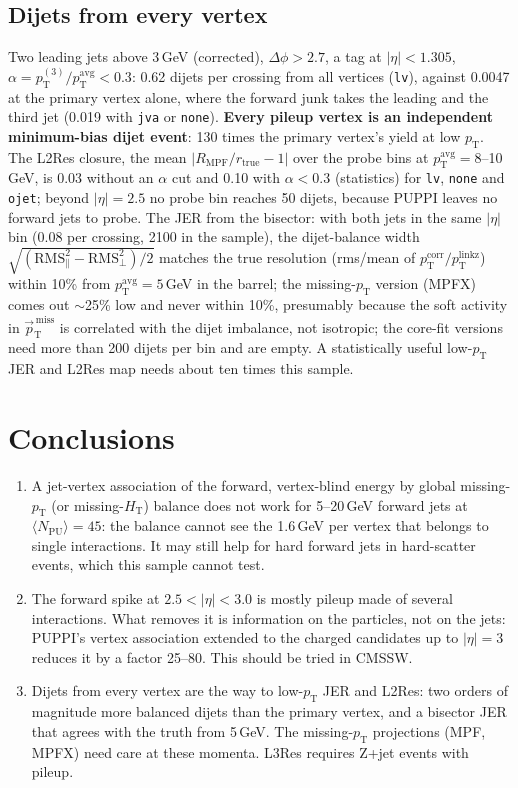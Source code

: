 \documentclass[11pt,a4paper]{article}
\newcommand{\pt}{p_{\mathrm{T}}}
\newcommand{\met}{\vec{p}_{\mathrm{T}}^{\,\mathrm{miss}}}
\newcommand{\hl}[1]{\textcolor{good}{\textbf{#1}}}
\begin{document}
\subsection{Dijets from every vertex}
Two leading jets above 3\,GeV (corrected), $\Delta\phi>2.7$, a tag at
$|\eta|<1.305$, $\alpha = \pt^{(3)}/\pt^{\mathrm{avg}} < 0.3$: 0.62 dijets per
crossing from all vertices (\texttt{lv}), against 0.0047 at the primary vertex
alone, where the forward junk takes the leading and the third jet (0.019 with
\texttt{jva} or \texttt{none}). \hl{Every pileup vertex is an independent
minimum-bias dijet event}: 130 times the primary vertex's yield at low $\pt$.
The L2Res closure, the mean $|R_{\mathrm{MPF}}/r_{\mathrm{true}} - 1|$ over the
probe bins at $\pt^{\mathrm{avg}} = 8$--10\,GeV, is 0.03 without an $\alpha$ cut
and 0.10 with $\alpha<0.3$ (statistics) for \texttt{lv}, \texttt{none} and
\texttt{ojet}; beyond $|\eta| = 2.5$ no probe bin reaches 50 dijets, because
PUPPI leaves no forward jets to probe. The JER from the bisector: with both jets
in the same $|\eta|$ bin (0.08 per crossing, 2100 in the sample), the
dijet-balance width $\sqrt{(\mathrm{RMS}_\parallel^2 -
\mathrm{RMS}_\perp^2)/2}$ matches the true resolution (rms/mean of
$\pt^{\mathrm{corr}}/\pt^{\mathrm{linkz}}$) within 10\% from
$\pt^{\mathrm{avg}} = 5$\,GeV in the barrel; the missing-$\pt$ version (MPFX)
comes out $\sim$25\% low and never within 10\%, presumably because the soft
activity in $\met$ is correlated with the dijet imbalance, not isotropic; the
core-fit versions need more than 200 dijets per bin and are empty. A statistically
useful low-$\pt$ JER and L2Res map needs about ten times this sample.

\section{Conclusions}
\begin{enumerate}
\item A jet-vertex association of the forward, vertex-blind energy by global
  missing-$\pt$ (or missing-$H_{\mathrm{T}}$) balance does not work for 5--20\,GeV
  forward jets at $\langle N_{\mathrm{PU}}\rangle = 45$: the balance cannot see the
  1.6\,GeV per vertex that belongs to single interactions. It may still help for
  hard forward jets in hard-scatter events, which this sample cannot test.
\item The forward spike at $2.5<|\eta|<3.0$ is mostly pileup made of several
  interactions. What removes it is information on the particles, not on the jets:
  PUPPI's vertex association extended to the charged candidates up to
  $|\eta|=3$ reduces it by a factor 25--80. This should be tried in CMSSW.
\item Dijets from every vertex are the way to low-$\pt$ JER and L2Res: two orders of
  magnitude more balanced dijets than the primary vertex, and a bisector JER that
  agrees with the truth from 5\,GeV. The missing-$\pt$ projections (MPF, MPFX) need
  care at these momenta. L3Res requires Z+jet events with pileup.
\end{enumerate}
\end{document}

